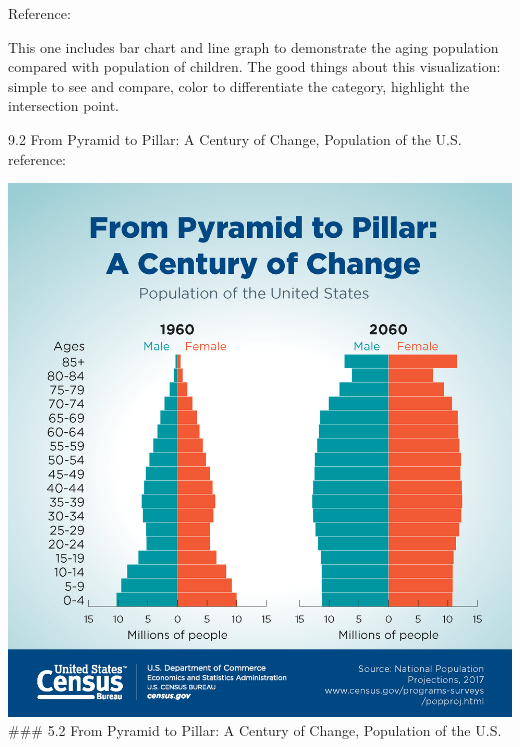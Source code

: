\documentclass[]{book}
\theoremstyle{definition}
\theoremstyle{definition}
\theoremstyle{definition}
\theoremstyle{remark}
\begin{document}
Reference: \citep{aging_nation}

This one includes bar chart and line graph to demonstrate the aging
population compared with population of children. The good things about
this visualization: simple to see and compare, color to differentiate
the category, highlight the intersection point.

9.2 From Pyramid to Pillar: A Century of Change, Population of the U.S.
reference:\citep{pyramid}

\includegraphics{images/Pyramid.jpg} \#\#\# 5.2 From Pyramid to Pillar:
A Century of Change, Population of the U.S.
\end{document}
